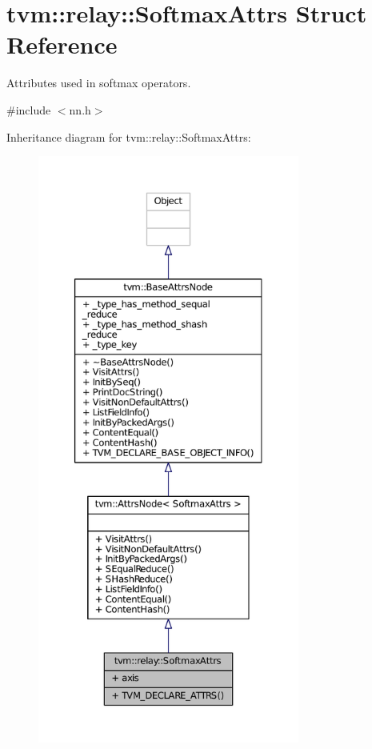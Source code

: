 \hypertarget{structtvm_1_1relay_1_1SoftmaxAttrs}{}\section{tvm\+:\+:relay\+:\+:Softmax\+Attrs Struct Reference}
\label{structtvm_1_1relay_1_1SoftmaxAttrs}


Attributes used in softmax operators.  




{\ttfamily \#include $<$nn.\+h$>$}



Inheritance diagram for tvm\+:\+:relay\+:\+:Softmax\+Attrs\+:
\nopagebreak
\begin{figure}[H]
\begin{center}
\leavevmode
\includegraphics[height=550pt]{structtvm_1_1relay_1_1SoftmaxAttrs__inherit__graph}
\end{center}
\end{figure}


